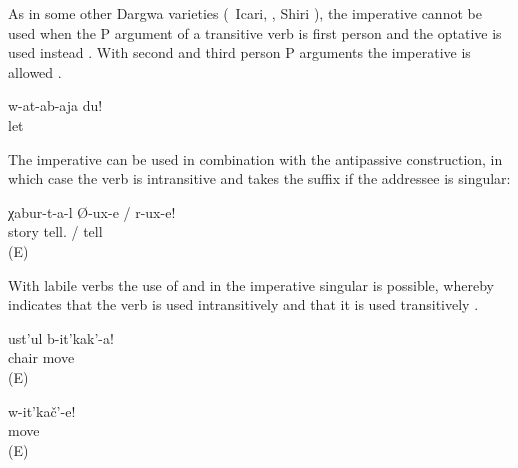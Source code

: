 As in some other Dargwa varieties (\teg\ Icari, \citealp[98]{Sumbatova.Mutalov2003}, Shiri \citealp{BelyaevInPreparation}), the imperative cannot be used when the P argument of a transitive verb is first person and the optative is used instead . With second and third person P arguments the imperative is allowed .
%
\begin{exe}
	\ex	\label{ex:Leave me}
	\gll	w-at-ab-aja	du!\\
		let	\\
	\glt	{}
\end{exe}

The imperative can be used in combination with the antipassive construction, in which case the verb is intransitive and takes the suffix  if the addressee is singular: 
%
\begin{exe}
	\ex	\label{ex:Tell stories}
	\gll	χabur-t-a-l	Ø-ux-e	/	r-ux-e!\\
		story	tell.	/	tell\\
	\glt	{} (E)
\end{exe}

With labile verbs the use of  and  in the imperative singular is possible, whereby  indicates that the verb is used intransitively and  that it is used transitively .

\begin{exe}

		\ex	\label{ex:Move the chair}
		\gll	ust'ul	b-it'kak'-a!\\
			chair	move\\
		\glt	{} (E)
	
		\ex	\label{ex:Move (yourself)}
		\gll	w-it'kač'-e!\\
			move\\
		\glt	{} (E)

\end{exe}

